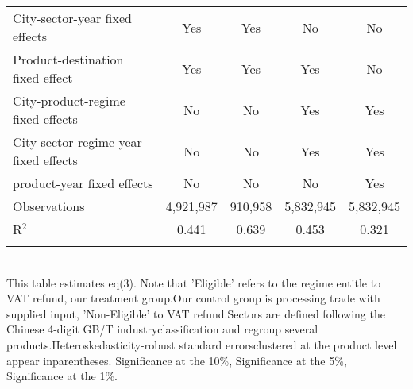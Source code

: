 \documentclass[preview]{standalone}
\begin{document}
\begin{table}[!htbp]
\begin{adjustbox}{width=\textwidth, totalheight=\baselineskip,keepaspectratio}
\begin{tabular}{@{\extracolsep{5pt}}lcccc}
City-sector-year fixed effects & Yes & Yes & No & No \\ 
Product-destination fixed effect & Yes & Yes & Yes & No \\ 
City-product-regime fixed effects & No & No & Yes & Yes \\ 
City-sector-regime-year fixed effects & No & No & Yes & Yes \\ 
product-year fixed effects & No & No & No & Yes \\ 
Observations & 4,921,987 & 910,958 & 5,832,945 & 5,832,945 \\ 
R$^{2}$ & 0.441 & 0.639 & 0.453 & 0.321 \\ 
\hline 
\hline \\[-1.8ex] 
\end{tabular}
\end{adjustbox}
\begin{tablenotes} 
 \small 
 \item \\ 
This table estimates eq(3). Note that 'Eligible' refers to the regime entitle to VAT refund, our treatment group.Our control group is processing trade with supplied input, 'Non-Eligible' to VAT refund.Sectors are defined following the Chinese 4-digit GB/T industryclassification and regroup several products.Heteroskedasticity-robust standard errorsclustered at the product level appear inparentheses.\sym{*} Significance at the 10\%, \sym{**} Significance at the 5\%, \sym{***} Significance at the 1\%. 
\end{tablenotes}
\end{table}
\end{document}
